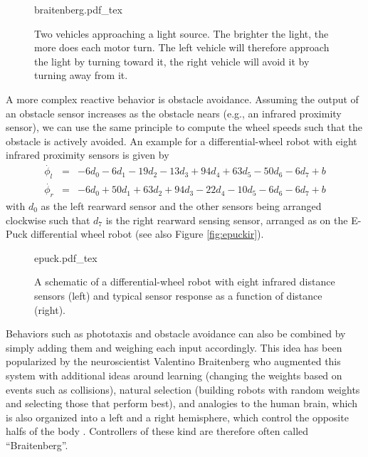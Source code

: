 \begin{figure}
    \centering
    \def\svgwidth{0.7\textwidth}
    {braitenberg.pdf_tex}
    \caption{Two vehicles approaching a light source. The brighter the light, the more does each motor turn. The left vehicle will therefore approach the light by turning toward it, the right vehicle will avoid it by turning away from it.\label{fig:braitenberg}}
\end{figure}

A more complex reactive behavior is obstacle avoidance. Assuming the output of an obstacle sensor increases as the obstacle nears (e.g., an infrared proximity sensor), we can use the same principle to compute the wheel speeds such that the obstacle is actively avoided. An example for a differential-wheel robot with eight infrared proximity sensors is given by
\begin{eqnarray}
\nonumber
\dot{\phi_l}&=&-6d_0-6d_1-19d_2-13d_3+94d_4+63d_5-50d_6-6d_7+b\\
\nonumber
\dot{\phi_r}&=&-6d_0+50d_1+63d_2+94d_3-22d_4-10d_5-6d_6-6d_7+b
\end{eqnarray}
%
%
with $d_0$ as the left rearward sensor and the other sensors being arranged clockwise such that $d_7$ is the right rearward sensing sensor, arranged as on the E-Puck differential wheel robot \cite{mondada2009puck} (see also Figure \ref{fig:epuckir}).

\begin{figure}
\centering
    \def\svgwidth{\textwidth}
    {epuck.pdf_tex}
    \caption{A schematic of a differential-wheel robot with eight infrared distance sensors (left) and typical sensor response as a function of distance (right).}
\end{figure}

Behaviors such as phototaxis and obstacle avoidance can also be combined by simply adding them and weighing each input accordingly. This idea has been popularized by the neuroscientist Valentino Braitenberg who augmented this system with additional ideas around learning (changing the weights based on events such as collisions), natural selection (building robots with random weights and selecting those that perform best), and analogies to the human brain, which is also organized into a left and a right hemisphere, which control the opposite halfs of the body \cite{braitenberg1986vehicles}. Controllers of these kind are therefore often called ``Braitenberg''.

